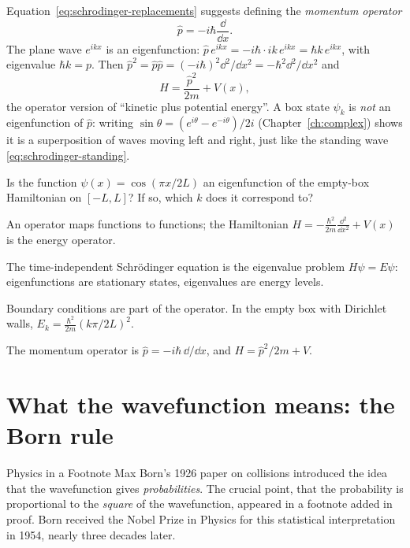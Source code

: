 Equation~\eqref{eq:schrodinger-replacements} suggests defining the \emph{momentum operator}
\begin{equation}
\hat p=-i\hbar\frac{\dd}{\dd x}.
\label{eq:schrodinger-momentum}
\end{equation}
The plane wave $e^{ikx}$ is an eigenfunction: $\hat p\,e^{ikx}=-i\hbar\cdot ik\,e^{ikx}=\hbar k\,e^{ikx}$, with eigenvalue $\hbar k=p$. Then $\hat p^2=\hat p\hat p=(-i\hbar)^2\dd^2/\dd x^2=-\hbar^2\dd^2/\dd x^2$ and
\begin{equation}
H=\frac{\hat p^2}{2m}+V(x),
\end{equation}
the operator version of ``kinetic plus potential energy''. A box state $\psi_k$ is \emph{not} an eigenfunction of $\hat p$: writing $\sin\theta=(e^{i\theta}-e^{-i\theta})/2i$ (Chapter~\ref{ch:complex}) shows it is a superposition of waves moving left and right, just like the standing wave \eqref{eq:schrodinger-standing}.

\begin{checkpoint}
Is the function $\psi(x)=\cos(\pi x/2L)$ an eigenfunction of the empty-box Hamiltonian on $[-L,L]$? If so, which $k$ does it correspond to?
\end{checkpoint}

\begin{keyideas}
\item An operator maps functions to functions; the Hamiltonian $H=-\frac{\hbar^2}{2m}\frac{\dd^2}{\dd x^2}+V(x)$ is the energy operator.
\item The time-independent Schr\"odinger equation is the eigenvalue problem $H\psi=E\psi$: eigenfunctions are stationary states, eigenvalues are energy levels.
\item Boundary conditions are part of the operator. In the empty box with Dirichlet walls, $E_k=\frac{\hbar^2}{2m}(k\pi/2L)^2$.
\item The momentum operator is $\hat p=-i\hbar\,\dd/\dd x$, and $H=\hat p^2/2m+V$.
\end{keyideas}

\section{What the wavefunction means: the Born rule}\label{sec:schrodinger-born}
\begin{didyouknow}{Physics in a Footnote}
Max Born's 1926 paper on collisions introduced the idea that the wavefunction gives \emph{probabilities}. The crucial point, that the probability is proportional to the \emph{square} of the wavefunction, appeared in a footnote added in proof. Born received the Nobel Prize in Physics for this statistical interpretation in 1954, nearly three decades later.
\end{didyouknow}

